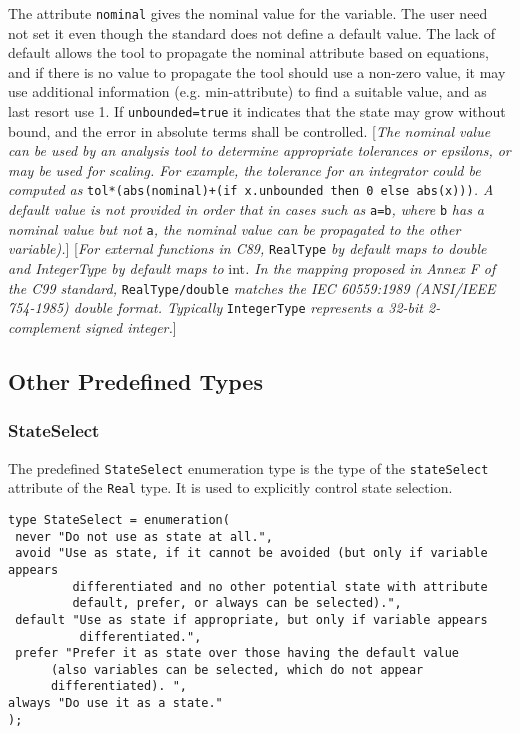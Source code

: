 The attribute \lstinline!nominal! gives the nominal value for the variable. The user
need not set it even though the standard does not define a default
value. The lack of default allows the tool to propagate the nominal
attribute based on equations, and if there is no value to propagate the
tool should use a non-zero value, it may use additional information
(e.g. min-attribute) to find a suitable value, and as last resort use 1.
If \lstinline!unbounded=true! it indicates that the state may grow without
bound, and the error in absolute terms shall be controlled. {[}\emph{The
nominal value can be used by an analysis tool to determine appropriate
tolerances or epsilons, or may be used for scaling. For example, the
tolerance for an integrator could be computed as} \lstinline!tol*(abs(nominal)+(if x.unbounded then 0 else abs(x)))!\emph{. A
default value is not provided in order that in cases such as} \lstinline!a=b!\emph{, where} \lstinline!b! \emph{has a nominal value but not} \lstinline!a!\emph{, the nominal value can be propagated to the other
variable).}{]} {[}\emph{For external functions in C89,} \lstinline!RealType!
\emph{by default maps to double and IntegerType by default maps to}
int\emph{. In the mapping proposed in Annex F of the C99 standard,}
\lstinline!RealType/double! \emph{matches the IEC 60559:1989 (ANSI/IEEE 754-1985)
double format. Typically} \lstinline!IntegerType! \emph{represents a 32-bit
2-complement signed integer.}{]}

\subsection{Other Predefined Types}

\subsubsection{StateSelect}

The predefined \lstinline!StateSelect! enumeration type is the type of the
\lstinline!stateSelect! attribute of the \lstinline!Real! type. It is used to explicitly control
state selection.

\begin{lstlisting}[language=modelica]
type StateSelect = enumeration(
 never "Do not use as state at all.",
 avoid "Use as state, if it cannot be avoided (but only if variable appears
         differentiated and no other potential state with attribute
         default, prefer, or always can be selected).",
 default "Use as state if appropriate, but only if variable appears
          differentiated.",
 prefer "Prefer it as state over those having the default value
      (also variables can be selected, which do not appear
      differentiated). ",
always "Do use it as a state."
);
\end{lstlisting}

